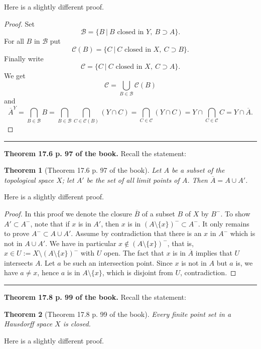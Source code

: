 \documentclass[12pt,letterpaper]{article}
\newtheorem{thm}{Theorem}%
\newcommand{\mc}{\mathcal}
\newcommand{\noi}{\noindent}%
\newcommand{\sm}{\setminus}
\begin{document}
Here is a slightly different proof. 

\begin{proof} 
Set 
$$
\mc B=\{B\ |\ B\text{ closed in }Y,\ B\supset A\}.
$$ 
For all $B$ in $\mc B$ put 
$$
\mc C(B)=\{C\ |\ C\text{ closed in }X,\ C\supset B\}.
$$ 
Finally write 
$$
\mc C=\{C\ |\ C\text{ closed in }X,\ C\supset A\}.
$$ 
We get 
$$
\mc C=\bigcup_{B\in\mc B}\mc C(B)
$$ 
and 
$$
\overline A^Y=\bigcap_{B\in\mc B}B=\bigcap_{B\in\mc B}\bigcap_{C\in\mc C(B)}(Y\cap C)=\bigcap_{C\in\mc C}(Y\cap C)=Y\cap\bigcap_{C\in\mc C}C=Y\cap\overline A.
$$ 
\end{proof}

\hrule\medskip

\noi\textbf{Theorem 17.6 p. 97 of the book.} Recall the statement: %

\begin{thm}[Theorem 17.6 p. 97 of the book]%
Let $A$ be a subset of the topological space $X$; let $A'$ be the set of all limit points of $A$. Then $\overline A=A\cup A'$. 
\end{thm} 

Here is a slightly different proof. 

\begin{proof}
In this proof we denote the closure $\overline B$ of a subset $B$ of $X$ by $B^-$. To show $A'\subset A^-$, note that if $x$ is in $A'$, then $x$ is in $(A\sm\{x\})^-\subset A^-$. It only remains to prove $A^-\subset A\cup A'$. Assume by contradiction that there is an $x$ in $A^-$ which is not in $A\cup A'$. We have in particular $x\notin(A\sm\{x\})^-$, that is, $x\in U:=X\sm(A\sm\{x\})^-$ with $U$ open. The fact that $x$ is in $\overline A$ implies that $U$ intersects $A$. Let $a$ be such an intersection point. Since $x$ is not in $A$ but $a$ is, we have $a\ne x$, hence $a$ is in $A\sm\{x\}$, which is disjoint from $U$, contradiction. 
\end{proof} 

\hrule\medskip

\noi\textbf{Theorem 17.8 p. 99 of the book.} Recall the statement: 

\begin{thm}[Theorem 17.8 p. 99 of the book]%
Every finite point set in a Hausdorff space $X$ is closed.
\end{thm} 

Here is a slightly different proof. 
\end{document}
